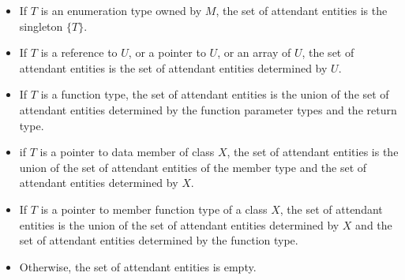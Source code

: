 \begin{std.txt}
\begin{itemize}
    \item If $T$ is an enumeration type owned by $M$, 
    the set of attendant entities is the singleton $\{T\}$.

    \item If $T$ is a reference to $U$, or a pointer to $U$, or an array of $U$, 
    the set of attendant entities is the set of attendant entities determined by $U$.

    \item If $T$ is a function type, the set of attendant entities is the
    union of the set of attendant entities determined by the function
    parameter types and the return type.

    \item if $T$ is a pointer to data member of class $X$, the set of attendant
    entities is the union of the set of attendant entities of the member type
    and the set of attendant entities determined by $X$.
    
    \item If $T$ is a pointer to member function type of a class $X$, the
    set of attendant entities is the union of the set of attendant entities
     determined by $X$ and the set of attendant entities determined by
    the function type.
    
    \item Otherwise, the set of attendant entities is empty.
  \end{itemize}


\end{std.txt}
